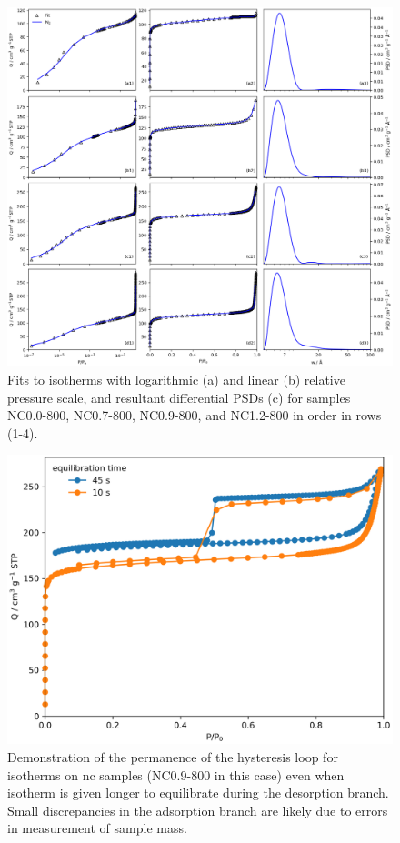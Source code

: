 \begin{appendices}
\begin{figure}[p]
    \centering
    \includegraphics[width=\columnwidth, keepaspectratio]{4-impregnation/figs/NCxx-800_isopsd.png}
    \caption{Fits to  isotherms with logarithmic (a) and linear (b) relative pressure scale, and resultant differential PSDs (c) for samples NC0.0-800, NC0.7-800, NC0.9-800, and NC1.2-800 in order in rows (1-4).}
    \label{fig:NCxx-800_psdisofull}
\end{figure}

\begin{figure}[p]
    \centering
    \includegraphics[width=\columnwidth, keepaspectratio]{4-impregnation/figs/hyst.png}
    \caption{Demonstration of the permanence of the hysteresis loop for  isotherms on \acrshort{nc} samples (NC0.9-800 in this case) even when isotherm is given longer to equilibrate during the desorption branch. Small discrepancies in the adsorption branch are likely due to errors in measurement of sample mass.}
    \label{fig:hyst}
\end{figure}


\end{appendices}
